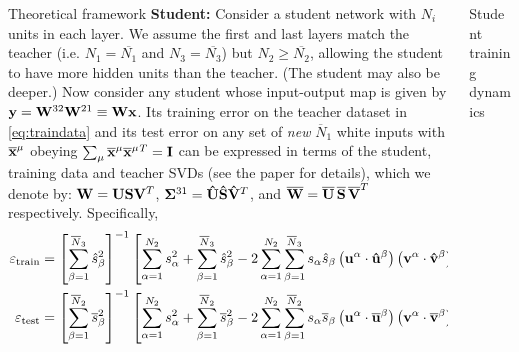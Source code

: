 \documentclass[final]{beamer}
\newcommand{\bb}[1]{{\bf\overline{#1}}}
\newcommand{\bh}[1]{{\bf\hat{#1}}}
\newcommand{\trainerr}{\mathcal{\varepsilon}_\text{train}}
\newcommand{\generr}{\mathcal{\varepsilon}_\text{test}}
\begin{document}
\begin{frame}[t]{}
\begin{columns}
\begin{column}{0.25\textwidth}
\begin{block}{\large Theoretical framework}
\textbf{Student:} Consider a student network with \(N_i\) units in each layer. We assume the first and last layers match the teacher (i.e. \(N_1 = \overline{N_1}\) and \(N_3 = \overline{N_3}\)) but \(N_2 \geq \overline{N_2}\), allowing the student to have more hidden units than the teacher. (The student may also be deeper.) Now consider any student whose input-output map is given by \({\bf y} = {\bf W}^{32} {\bf W}^{21} \equiv {\bf Wx}\). Its training error on the teacher dataset in \eqref{eq:traindata} and its test error on any set of {\it new} \(\overline{N}_1 \) white inputs with \({\bb{x}}^\mu\) obeying \(\sum_{\mu} {\bb{x}}^\mu {\bb{x}}^\mu{}^T = {\bf I}\) can be expressed in terms of the student, training data and teacher SVDs (see the paper for details), which we denote by: 
\({\bf W} = {\bf U}{\bf S}{\bf V}^T \),  
\({\bf \Sigma}^{31} = {\bh U}{\bh S}{\bh V}^T \), and 
\(\bb{W} = \bb{U}\, \bb{S}\,\bb{V}^T\) respectively. Specifically,
\begin{align}
\trainerr &= \left[\sum_{\beta=1}^{\overline{N}_3} \hat{s}_{\beta}^2\right]^{-1} 
\left[ \sum_{\alpha=1}^{N_2} s_{\alpha}^2 +  \sum_{\beta=1}^{\overline{N}_3} \hat{s}_{\beta}^2
- 2 \sum_{\alpha=1}^{N_2} \sum_{\beta=1}^{\overline{N}_3}  s_{\alpha} \hat{s}_{\beta} \left({\bf u}^{\alpha} \cdot \bf{\hat u}^{\beta} \right) \left({\bf v}^{\alpha} \cdot \bf{\hat v}^{\beta} \right)\right] \label{eq:trainerr}\\
\generr &= \left[\sum_{\beta=1}^{\overline{N}_2} \overline{s}_{\beta}^2\right]^{-1} 
\left[ \sum_{\alpha=1}^{N_2} s_{\alpha}^2 +  \sum_{\beta=1}^{\overline{N}_2} \overline{s}_{\beta}^2
- 2 \sum_{\alpha=1}^{N_2} \sum_{\beta=1}^{\overline{N}_2}  s_{\alpha} \overline{s}_{\beta} \left({\bf u}^{\alpha} \cdot \bb{u}^{\beta} \right) \left({\bf v}^{\alpha} \cdot \bb{v}^{\beta} \right)\right] \label{eq:generr}
\end{align}
\end{block}
\end{column}
\begin{column}{0.25\textwidth}
\begin{block}{\large Student training dynamics}
\begin{figure}[H]
\vspace{-0.5em}
\centering
\begin{subfigure}[t]{0.35\textwidth}
\texttt{[image: ../../plots/paper/fig\_1a.png]}
\label{s_of_t_a}
\end{subfigure}~
\begin{subfigure}[t]{0.35\textwidth}
\texttt{[image: ../../plots/paper/fig\_1b.png]}

\end{subfigure}
\end{figure}
\end{block}
\end{column}
\end{columns}
\end{frame}
\end{document}
